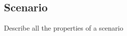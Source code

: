 \subsection{Scenario}
\label{sec:formal scenario}

\color{red}

Describe all the properties of a scenario

\color{black}
